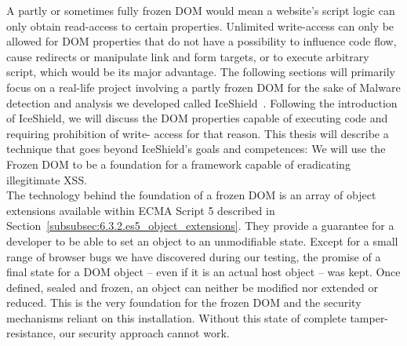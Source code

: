       A partly or sometimes fully frozen DOM would mean a website's script logic can only obtain read-access to certain properties. Unlimited write-access can only be allowed for DOM properties that do not have a possibility to influence code flow, cause redirects or manipulate link and form targets, or to execute arbitrary script, which would be its major advantage. The following sections will primarily focus on a real-life project involving a partly frozen DOM for the sake of Malware detection and analysis we developed called IceShield~\cite{heiderich2011iceshield}. Following the introduction of IceShield, we will discuss the DOM properties capable of executing code and requiring prohibition of write- access for that reason. This thesis will describe a technique that goes beyond IceShield's goals and competences: We will use the Frozen DOM to be a foundation for a framework capable of eradicating illegitimate XSS.\\

      The technology behind the foundation of a frozen DOM is an array of object extensions available within ECMA Script 5 described in Section~\ref{subsubsec:6.3.2.es5_object_extensions}. They provide a guarantee for a developer to be able to set an object to an unmodifiable state. Except for a small range of browser bugs we have discovered during our testing, the promise of a final state for a DOM object -- even if it is an actual host object -- was kept. Once defined, sealed and frozen, an object can neither be modified nor extended or reduced. This is the very foundation for the frozen DOM and the security mechanisms reliant on this installation. Without this state of complete tamper-resistance, our security approach cannot work. \\ 
 
